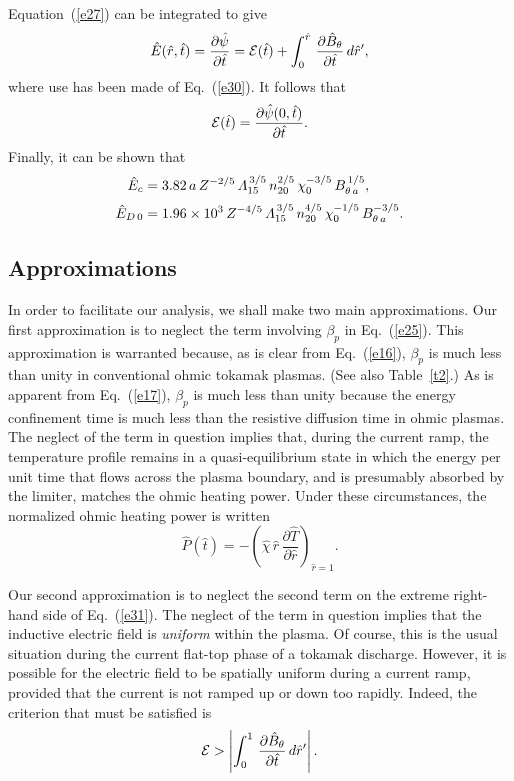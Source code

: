 \documentclass[12pt,prb,aps]{revtex4-1}
\begin{document}
 Equation~(\ref{e27}) can be integrated to give
 \begin{equation}\label{e31}
 \hat{E}(\hat{r},\hat{t})= \frac{\partial\hat{\psi}}{\partial \hat{t}}={\cal E}(\hat{t})+\int_0^{\hat{r}}\,\frac{\partial\hat{B}_\theta}{\partial\hat{t}}\,d\hat{r}',
 \end{equation}
 where use has been made of Eq.~(\ref{e30}). It follows that 
 \begin{equation}
 {\cal E}(\hat{t}) = \frac{\partial\hat{\psi}(0,\hat{t})}{\partial\hat{t}}.
 \end{equation}
 Finally, it can be shown that
 \begin{align}
 \hat{E}_c&= 3.82\,a\,Z^{-2/5}\,{\mit\Lambda}_{15}^{\,3/5}\,n_{20}^{2/5}\,\chi_0^{-3/5}\,B_{\theta\,a}^{\,1/5},\\[0.5ex]
 \hat{E}_{D\,0} &= 1.96\times 10^3\,Z^{-4/5}\,{\mit\Lambda}_{15}^{\,3/5}\,n_{20}^{4/5}\,\chi_0^{-1/5}\,B_{\theta\,a}^{-3/5}.
 \end{align}
 
\subsection{Approximations}
In order to facilitate our analysis, we shall make two main approximations. 
Our first approximation is to neglect the term involving $\beta_p$ in Eq.~(\ref{e25}).
This approximation is warranted because, as is clear from Eq.~(\ref{e16}), $\beta_p$ is much less than unity in  conventional ohmic
tokamak plasmas. (See also Table~\ref{t2}.) As is apparent from Eq.~(\ref{e17}), $\beta_p$ is much less than unity because the energy confinement time is much less than
the resistive diffusion time in ohmic plasmas. The neglect of the term in question implies that, during the current ramp,  the temperature profile remains in a quasi-equilibrium state in which
the energy per unit time that flows across the plasma boundary, and is presumably absorbed by the limiter, matches the ohmic heating power. Under these
circumstances, the normalized ohmic heating power is written
\begin{equation}\label{e36}
\hat{P}(\hat{t}) = - \left(\hat{\chi}\,\hat{r}\,\frac{\partial\hat{T}}{\partial\hat{r}}\right)_{\hat{r}=1}.
\end{equation}

Our second approximation is to neglect the second term on the extreme right-hand side of Eq.~(\ref{e31}). The neglect of the term in question implies that
the inductive electric field is {\em uniform}\/ within the plasma. Of course, this is the usual situation during the current flat-top phase of a tokamak
discharge. However, it is possible for the electric field to be spatially uniform during a current ramp, provided that the current is not ramped up or down too
rapidly. Indeed, the criterion that must be satisfied is
\begin{equation}\label{e35}
{\cal E} >\left| \int_0^{1}\,\frac{\partial\hat{B}_\theta}{\partial\hat{t}}\,d\hat{r}'\right|.
\end{equation}
\end{document}

